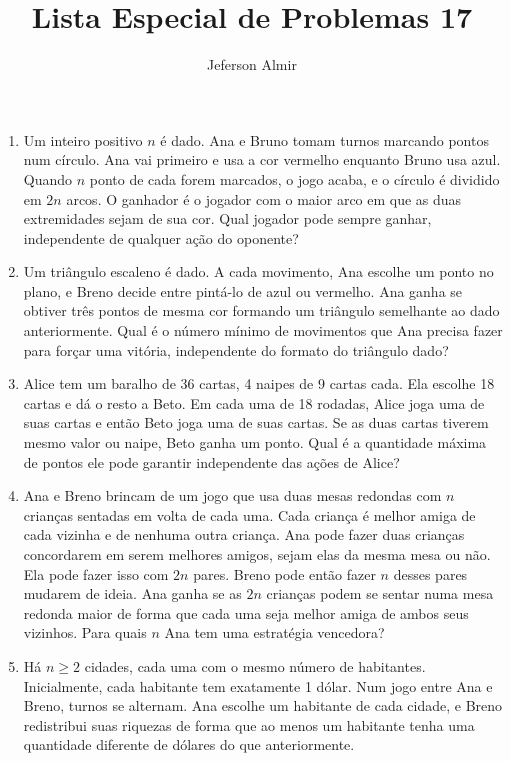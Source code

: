 \documentclass{article}
\title{Lista Especial de Problemas 17}
\author{Jeferson Almir}
\date{}
\begin{document}
\maketitle

\begin{enumerate}
    \item Um inteiro positivo $n$ é dado. Ana e Bruno tomam turnos marcando pontos num círculo. Ana vai primeiro e usa a cor vermelho enquanto Bruno usa azul. Quando $n$ ponto de cada forem marcados, o jogo acaba, e o círculo é dividido em $2n$ arcos. O ganhador é o jogador com o maior arco em que as duas extremidades sejam de sua cor. Qual jogador pode sempre ganhar, independente de qualquer ação do oponente?
    
    \item Um triângulo escaleno é dado. A cada movimento, Ana escolhe um ponto no plano, e Breno decide entre pintá-lo de azul ou vermelho. Ana ganha se obtiver três pontos de mesma cor formando um triângulo semelhante ao dado anteriormente. Qual é o número mínimo de movimentos que Ana precisa fazer para forçar uma vitória, independente do formato do triângulo dado?
    
    \item Alice tem um baralho de 36 cartas, 4 naipes de 9 cartas cada. Ela escolhe 18 cartas e dá o resto a Beto. Em cada uma de 18 rodadas, Alice joga uma de suas cartas e então Beto joga uma de suas cartas. Se as duas cartas tiverem mesmo valor ou naipe, Beto ganha um ponto. Qual é a quantidade máxima de pontos ele pode garantir independente das ações de Alice?
    
    \item Ana e Breno brincam de um jogo que usa duas mesas redondas com $n$ crianças sentadas em volta de cada uma. Cada criança é melhor amiga de cada vizinha e de nenhuma outra criança. Ana pode fazer duas crianças concordarem em serem melhores amigos, sejam elas da mesma mesa ou não. Ela pode fazer isso com $2n$ pares. Breno pode então fazer $n$ desses pares mudarem de ideia. Ana ganha se as $2n$ crianças podem se sentar numa mesa redonda maior de forma que cada uma seja melhor amiga de ambos seus vizinhos. Para quais $n$ Ana tem uma estratégia vencedora?
    
    \item Há $n\ge2$ cidades, cada uma com o mesmo número de habitantes. Inicialmente, cada habitante tem exatamente 1 dólar. Num jogo entre Ana e Breno, turnos se alternam. Ana escolhe um habitante de cada cidade, e Breno redistribui suas riquezas de forma que ao menos um habitante tenha uma quantidade diferente de dólares do que anteriormente.
    

\end{enumerate}
\end{document}
